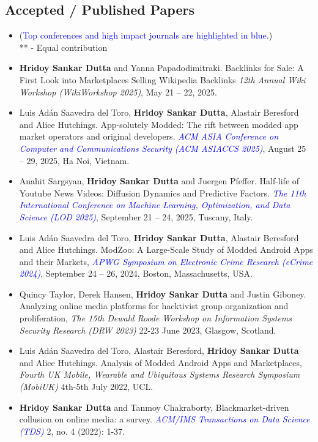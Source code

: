 \documentclass[margin, centered,lmodern]{res}
\begin{document}
\begin{resume}
\section{Accepted / Published Papers}
\begin{itemize}[leftmargin=*]
\item[] (\textcolor{blue}{Top conferences and high impact journals are highlighted in blue.}) \\ ** - Equal contribution
\item \textbf{Hridoy Sankar Dutta} and Yanna Papadodimitraki. Backlinks for Sale: A First Look into Marketplaces Selling Wikipedia Backlinks \textit{12th Annual Wiki Workshop (WikiWorkshop 2025)}, May 21 – 22, 2025.
\item Luis Adán Saavedra del Toro,  \textbf{Hridoy Sankar Dutta}, Alastair Beresford and Alice Hutchings. App-solutely Modded: The rift between modded app market operators and original developers.   \textit{\textcolor{blue}{ACM ASIA Conference on Computer and Communications Security (ACM ASIACCS 2025)}}, August 25 – 29, 2025, Ha Noi, Vietnam.
\item Anahit Sargsyan, \textbf{Hridoy Sankar Dutta} and Juergen Pfeffer.  Half-life of Youtube News Videos: Diffusion Dynamics and Predictive Factors.   \textit{\textcolor{blue}{The 11th International Conference on Machine Learning, Optimization, and Data Science (LOD 2025)}}, September 21 – 24, 2025, Tuscany, Italy.
\item Luis Adán Saavedra del Toro,  \textbf{Hridoy Sankar Dutta}, Alastair Beresford and Alice Hutchings.  ModZoo: A Large-Scale Study of Modded Android Apps and their Markets,  \textit{\textcolor{blue}{APWG Symposium on Electronic Crime Research (eCrime 2024)}}, September 24 – 26, 2024, Boston, Massachusetts, USA.
\item Quincy Taylor,  Derek Hansen,  \textbf{Hridoy Sankar Dutta} and Justin Giboney. Analyzing online media platforms for hacktivist group organization and proliferation,  \textit{The 15th Dewald Roode Workshop on Information Systems Security Research (DRW 2023)} 22-23 June 2023, Glasgow, Scotland.

\item Luis Adán Saavedra del Toro,  Alastair Beresford,  \textbf{Hridoy Sankar Dutta} and Alice Hutchings. Analysis of Modded Android Apps and Marketplaces,  \textit{Fourth UK Mobile, Wearable and Ubiquitous Systems Research Symposium (MobiUK)} 4th-5th July 2022, UCL.

\item \textbf{Hridoy Sankar Dutta} and Tanmoy Chakraborty, Blackmarket-driven collusion on online media: a survey.  \textit{\textcolor{blue}{ACM/IMS Transactions on Data Science (TDS)}} 2, no. 4 (2022): 1-37.


\end{itemize}
\end{resume}
\end{document}
